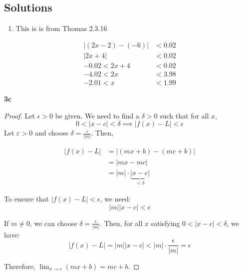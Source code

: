 \documentclass{article}
\begin{document}
\pagebreak
\subsection{Solutions}
\begin{enumerate}
\item This is is from Thomas 2.3.16
\end{enumerate}

\begin{align*}
	\left| (2x-2) - (-6) \right| &< 0.02 \\
	 \left| 2x +4 \right| 	 &< 0.02 \\
	-0.02 < 2x+4 &< 0.02 \\
	-4.02 < 2x &< 3.98 \\
	-2.01 < x &< 1.99
\end{align*}

\textbf{3c}
\begin{proof}
  Let $\epsilon > 0$ be given. We need to find a $\delta > 0$ such that for all $x$,
  \begin{equation*}
    0 < |x - c| < \delta \implies |f(x) - L| < \epsilon
  \end{equation*}
  Let $\varepsilon>0$ and choose $\delta = \frac{\varepsilon}{\left|m\right|}$. Then,
  
  \begin{align*}
    |f(x) - L| &= |(mx + b) - (mc + b)| \\
                 &= |mx - mc| \\
                 &= |m|\cdot\underbrace{|x-c|}_{< \delta}
  \end{align*}
  
  To ensure that $|f(x) - L| < \epsilon$, we need:
  \begin{equation*}
    |m||x - c| < \epsilon
  \end{equation*}
  
  If $m \neq 0$, we can choose $\delta = \frac{\epsilon}{|m|}$. Then, for all $x$ satisfying $0 < |x - c| < \delta$, we have:
  \begin{equation*}
    |f(x) - L| = |m||x - c| < |m| \cdot \frac{\epsilon}{|m|} = \epsilon
  \end{equation*}
  
  Therefore, $\lim_{x \to c} (mx + b) = mc + b$.
\end{proof}
\end{document}
